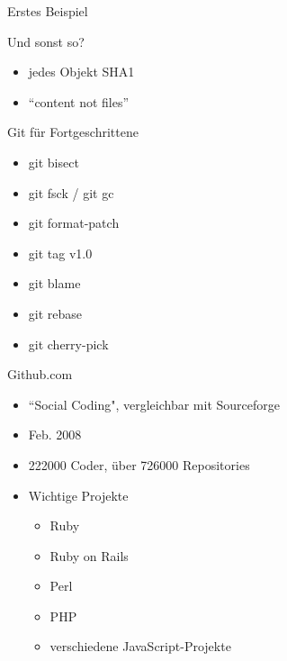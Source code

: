 \documentclass{beamer}
\begin{document}
\begin{frame}{Erstes Beispiel}

\end{frame}

\begin{frame}[<+->]{Und sonst so?}{}
  \begin{itemize}
    \item jedes Objekt SHA1
    \item ``content not files''
  \end{itemize}
\end{frame}

\begin{frame}[<+->]{Git für Fortgeschrittene}{}
  \begin{itemize}
    \item git bisect
    \item git fsck / git gc
    \item git format-patch
    \item git tag v1.0
    \item git blame
    \item git rebase
    \item git cherry-pick
  \end{itemize}
\end{frame}

\begin{frame}{Github.com}
\begin{itemize}
    \item ``Social Coding", vergleichbar mit Sourceforge
	\item Feb. 2008
	\item 222000 Coder, über 726000 Repositories
	\item Wichtige Projekte
	\begin{itemize}
	  \item Ruby
	  \item Ruby on Rails
	  \item Perl
	  \item PHP
	  \item verschiedene JavaScript-Projekte
	\end{itemize}
  \end{itemize}
\end{frame}
\end{document}
